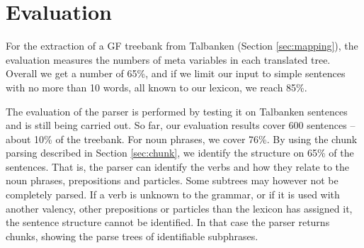 \documentclass[runningheads,a4paper]{llncs}
\begin{document}


\section{Evaluation}

For the extraction of a GF treebank from Talbanken (Section \ref{sec:mapping}),
the evaluation measures the numbers of meta variables in each translated tree.
Overall we get a number of 65\%, and if we limit our input to
simple sentences with no more than 10 words, all known to
our lexicon, we reach 85\%. 


The evaluation of the parser is performed by testing it on Talbanken sentences
and is still being carried out. So far, our evaluation results cover
600 sentences -- about 10\% of the treebank. 
For noun phrases, we cover 76\%.  By using the chunk parsing described in Section
\ref{sec:chunk}, we identify the structure on 65\% of the sentences. That
is, the parser can identify the verbs and how they relate to the noun phrases,
prepositions and particles. Some subtrees may  however not be
completely parsed. If a verb is unknown to the grammar, or if it is used with
another valency, other prepositions or particles than the lexicon has assigned
it, the sentence structure cannot be identified. In that case
the parser returns chunks, showing the parse trees of identifiable subphrases.
\end{document}
